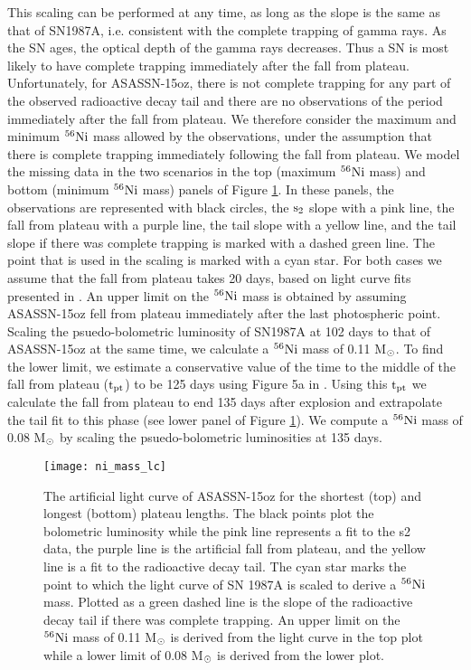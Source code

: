 \documentclass[a4paper,fleqn,usenatbib]{mnras}
\newcommand{\msun}{M$\rm{_{\odot}}$ }
\newcommand{\msunperiod}{M$\rm{_{\odot}}$}
\begin{document}
This scaling can be performed at any time, as long as the slope is the same as that of SN1987A, i.e. consistent with the complete trapping of gamma rays.
As the SN ages, the optical depth of the gamma rays decreases.
Thus a SN is most likely to have complete trapping immediately after the fall from plateau. 
Unfortunately, for ASASSN-15oz, there is not complete trapping for any part of the observed radioactive decay tail and there are no observations of the period immediately after the fall from plateau. 
We therefore consider the maximum and minimum $\rm{{}^{56}Ni}$ mass allowed by the observations, under the assumption that there is complete trapping immediately following the fall from plateau. 
We model the missing data in the two scenarios in the top (maximum $\rm{{}^{56}Ni}$ mass) and bottom (minimum $\rm{{}^{56}Ni}$ mass) panels of Figure \ref{fig:Ni}.
In these panels, the observations are represented with black circles, the $\rm{s_{2}}$ slope with a pink line, the fall from plateau with a purple line, the tail slope with a yellow line, and the tail slope if there was complete trapping is marked with a dashed green line. 
The point that is used in the scaling is marked with a cyan star.
For both cases we assume that the fall from plateau takes 20 days, based on light curve fits presented in \citet{2016valenti}. 
An upper limit on the $\rm{{}^{56}Ni}$ mass is obtained by assuming ASASSN-15oz fell from plateau immediately after the last photospheric point.
Scaling the psuedo-bolometric luminosity of SN1987A at 102 days to that of ASASSN-15oz at the same time, we calculate a $\rm{{}^{56}Ni}$ mass of 0.11 \msunperiod.
To find the lower limit, we estimate a conservative value of the time to the middle of the fall from plateau ($\rm{t_{pt}}$) to be 125 days using Figure 5a in \citet{2016valenti}.
Using this $\rm{t_{pt}}$ we calculate the fall from plateau to end 135 days after explosion and extrapolate the tail fit to this phase (see lower panel of Figure \ref{fig:Ni}). 
We compute a $\rm{{}^{56}Ni}$ mass of 0.08 \msun by scaling the psuedo-bolometric luminosities at 135 days.
\begin{figure}
\begin{center}
\texttt{[image: ni\_mass\_lc]} %
\caption{The artificial light curve of ASASSN-15oz for the shortest (top) and longest (bottom) plateau lengths. 
The black points plot the bolometric luminosity while the pink line represents a fit to the s2 data, the purple line is the artificial fall from plateau, and the yellow line is a fit to the radioactive decay tail.
The cyan star marks the point to which the light curve of SN 1987A is scaled to derive a $\rm{{}^{56}Ni}$ mass. 
Plotted as a green dashed line is the slope of the radioactive decay tail if there was complete trapping.
An upper limit on the $\rm{{}^{56}Ni}$ mass of 0.11 \msun is derived from the light curve in the top plot while a lower limit of 0.08 \msun is derived from the lower plot. }
\label{fig:Ni}
\end{center}
\end{figure}
\end{document}
